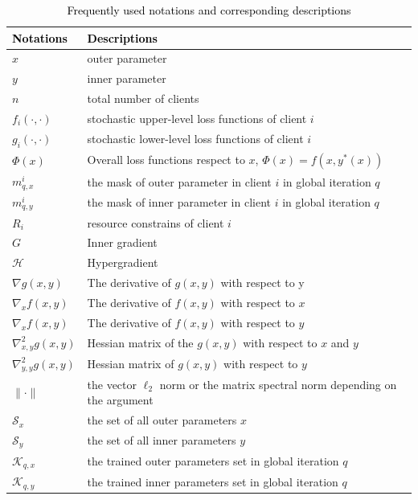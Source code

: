 \documentclass[lettersize,journal]{IEEEtran}
\newcommand{\attcolor}{black}
\begin{document}
\begin{table}[t]
 \caption{\textcolor{\attcolor}{Frequently used notations and corresponding descriptions}}
 \label{table:notation}
 \centering
	\begin{tabular}[t]{p{1.3cm} p{6.2cm}}
		\hline
		\textcolor{\attcolor}{Notations} & \textcolor{\attcolor}{Descriptions} \\ %
		\hline
        $x$ & outer parameter\\
        $y$ & inner parameter\\
        $n$ & total number of clients\\
        $f_i(\cdot,\cdot)$ & stochastic upper-level loss functions of client $i$\\
        $g_i(\cdot, \cdot)$&stochastic lower-level loss functions of client $i$\\
        $\Phi(x)$& Overall loss functions respect to $x$, $\Phi(x)=f(x, y^*(x)) $\\
        $m_{q,x}^i$& the mask of outer parameter in client $i$ in global iteration $q$ \\
        $m_{q,y}^i$& the mask of inner parameter in client $i$ in global iteration $q$ \\
        $R_i$ & resource constrains of client $i$\\
        $G$ & Inner gradient\\
        $\mathcal{H}$ & Hypergradient\\
        $\nabla g(x,y)$&The derivative of $g(x,y)$ with respect to y\\
        $\nabla_x f(x,y)$&The derivative of $f(x,y)$ with respect to $x$\\
        $\nabla_x f(x,y)$&The derivative of $f(x,y)$ with respect to $y$\\
        $\nabla_{x,y}^2 g(x,y)$&Hessian matrix of the $g(x,y)$ with respect to $x$ and $y$\\
        $\nabla_{y,y}^2 g(x,y)$&Hessian matrix of $g(x, y)$ with respect to $y$\\
		$\|\cdot\|$ & the vector $\ell_2$ norm or the matrix spectral norm depending on the argument\\
        $\mathcal{S}_x$ & the set of all outer parameters $x$\\
        $\mathcal{S}_y$ & the set of all inner parameters $y$\\
        $\mathcal{K}_{q,x}$ & the trained outer parameters set in global iteration $q$\\
        $\mathcal{K}_{q,y}$ & the trained inner parameters set in global iteration $q$\\

\end{tabular}
\end{table}
\end{document}
